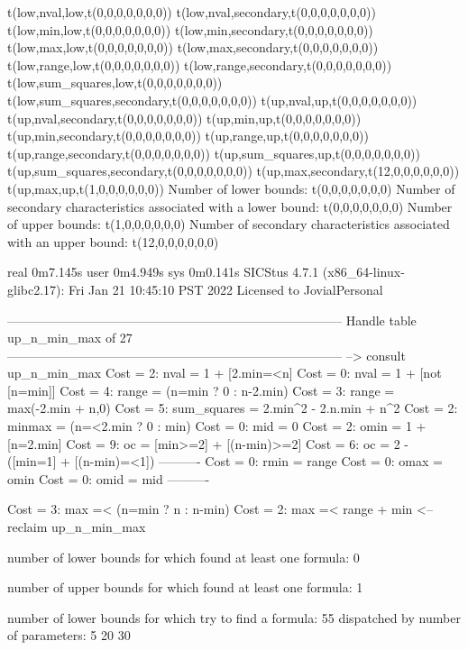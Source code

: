 t(low,nval,low,t(0,0,0,0,0,0,0))
t(low,nval,secondary,t(0,0,0,0,0,0,0))
t(low,min,low,t(0,0,0,0,0,0,0))
t(low,min,secondary,t(0,0,0,0,0,0,0))
t(low,max,low,t(0,0,0,0,0,0,0))
t(low,max,secondary,t(0,0,0,0,0,0,0))
t(low,range,low,t(0,0,0,0,0,0,0))
t(low,range,secondary,t(0,0,0,0,0,0,0))
t(low,sum_squares,low,t(0,0,0,0,0,0,0))
t(low,sum_squares,secondary,t(0,0,0,0,0,0,0))
t(up,nval,up,t(0,0,0,0,0,0,0))
t(up,nval,secondary,t(0,0,0,0,0,0,0))
t(up,min,up,t(0,0,0,0,0,0,0))
t(up,min,secondary,t(0,0,0,0,0,0,0))
t(up,range,up,t(0,0,0,0,0,0,0))
t(up,range,secondary,t(0,0,0,0,0,0,0))
t(up,sum_squares,up,t(0,0,0,0,0,0,0))
t(up,sum_squares,secondary,t(0,0,0,0,0,0,0))
t(up,max,secondary,t(12,0,0,0,0,0,0))
t(up,max,up,t(1,0,0,0,0,0,0))
Number of lower bounds:                                             t(0,0,0,0,0,0,0)
Number of secondary characteristics associated with a lower bound:  t(0,0,0,0,0,0,0)
Number of upper bounds:                                             t(1,0,0,0,0,0,0)
Number of secondary characteristics associated with an upper bound: t(12,0,0,0,0,0,0)

real	0m7.145s
user	0m4.949s
sys	0m0.141s
SICStus 4.7.1 (x86_64-linux-glibc2.17): Fri Jan 21 10:45:10 PST 2022
Licensed to JovialPersonal


--------------------------------------------------------------------------------
Handle table up_n_min_max of 27
--------------------------------------------------------------------------------
--> consult up_n_min_max
Cost =  2:  nval        = 1 + [2.min=<n]
Cost =  0:  nval        = 1 + [not [n=min]]
Cost =  4:  range       = (n=min ? 0 : n-2.min)
Cost =  3:  range       = max(-2.min + n,0)
Cost =  5:  sum_squares = 2.min^2 - 2.n.min + n^2
Cost =  2:  minmax      = (n=<2.min ? 0 : min)
Cost =  0:  mid         = 0
Cost =  2:  omin        = 1 + [n=2.min]
Cost =  9:  oc          = [min>=2] + [(n-min)>=2]
Cost =  6:  oc          = 2 - ([min=1] + [(n-min)=<1])
----------
Cost =  0:  rmin        = range
Cost =  0:  omax        = omin
Cost =  0:  omid        = mid
----------

Cost =  3:  max =< (n=min ? n : n-min)
Cost =  2:  max =< range + min
<-- reclaim up_n_min_max

number of lower bounds for which found at least one formula: 0

number of upper bounds for which found at least one formula: 1

number of lower bounds for which try to find a formula: 55
dispatched by number of parameters: 5  20  30

